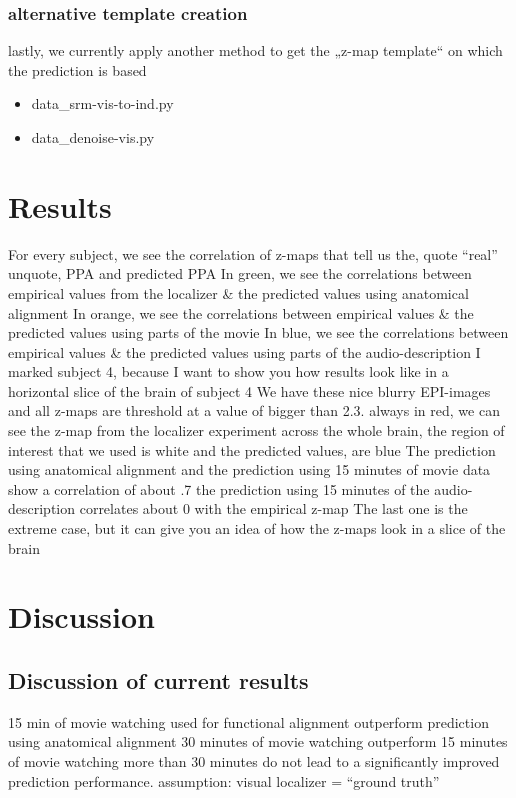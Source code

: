\subsubsection{alternative template creation}
%
lastly, we currently apply another method to get the „z-map template“ on which
the prediction is based
\begin{itemize}

\item data\_srm-vis-to-ind.py
\item data\_denoise-vis.py

\end{itemize}


\section{Results}
%
For every subject, we see the correlation of z-maps that tell us the, quote
``real'' unquote, PPA and predicted PPA
%
In green, we see the correlations between empirical values from the localizer \&
the predicted values using anatomical alignment
%
In orange, we see the correlations between empirical values \& the predicted
values using parts of the movie
%
In blue, we see the correlations between empirical values \& the predicted
values using parts of the audio-description
%
I marked subject 4, because I want to show you how results look like in a
horizontal slice of the brain of subject 4
%
We have these nice blurry EPI-images and all z-maps are threshold at a value of
bigger than 2.3.
%
always in red, we can see the z-map from the localizer experiment across the
whole brain,
%
the region of interest that we used is white and the predicted values, are blue
%
The prediction using anatomical alignment and the prediction using 15 minutes of
movie data show a correlation of about .7
%
the prediction using 15 minutes of the audio-description correlates about 0 with
the empirical z-map
%
The last one is the extreme case, but it can give you an idea of how the z-maps
look in a slice of the brain



\section{Discussion}


\subsection{Discussion of current results}
%
15 min of movie watching used for functional alignment outperform prediction
using anatomical alignment
%
30 minutes of movie watching outperform 15 minutes of movie watching
%
more than 30 minutes do not lead to a significantly improved prediction
performance.
%
assumption: visual localizer = ``ground truth''



